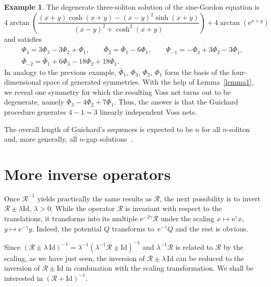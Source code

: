 \documentclass[pdftex]{sigma}
\def\RO{{\mathcal R}}
\numberwithin{equation}{section}
\theoremstyle{definition}
\newtheorem{Example}[Theorem]{Example}
\begin{document}
\begin{Example}
The degenerate three-soliton solution
of the sine-Gordon equation is
\[
4 \arctan\left(\frac{(x + y) \cosh(x + y) - (x - y)^2 \sinh(x + y)}{(x - y)^2 + \cosh^2(x + y)}\right) + 4 \arctan(\mathrm{e}^{x + y})
\]
\cite[equation~(2.13)]{JC-FC-AF-1917} and satisfies
\begin{gather*}
\Phi_4 = 3 \Phi_3 - 3 \Phi_2 + \Phi_1, \qquad
\bar\Phi_2 = \bar\Phi_1 - 6 \Phi_1,
\qquad
\Phi_{-1} = -\Phi_3 + 3 \Phi_2 - 3 \Phi_1, \\
\bar\Phi_{-2} = \bar\Phi_1 + 6 \Phi_3 - 18 \Phi_2 + 18 \Phi_1.
\end{gather*}
In analogy to the previous example, $\bar\Phi_1$, $\Phi_3$, $\Phi_2$, $\Phi_1$
form the basis of
the four-dimensional space of generated symmetries.
With the help of Lemma~\ref{lemma1},
we reveal one symmetry for which the resulting Voss net turns out
to be degenerate, namely $\Phi_3 - 4 \Phi_2 + 7\Phi_1$.
Thus, the answer is that the Guichard procedure generates
$4 - 1 = 3$ linearly independent Voss nets.
\end{Example}

The overall length of Guichard's sequences is expected to be $n$ for all
$n$-soliton and, more generally, all $n$-gap solutions~\cite{Z-T-F-1974}.








\section{More inverse operators}
\label{sect:neg}




Once $\RO^{-1}$ yields practically the same results as $\RO$,
the next possibility is to invert $\RO \pm \lambda \mathrm{Id}$,
$\lambda > 0$.
While the operator $\RO$ is invariant with respect to the translations,
it transforms into its multiple $\mathrm{e}^{-2\gamma} \RO$ under the scaling
$x \mapsto \mathrm{e}^\gamma x$, $y \mapsto \mathrm{e}^{-\gamma} y$.
Indeed, the potential $Q$ transforms to~${\mathrm{e}^{-\gamma} Q}$ and
the rest is obvious.




Since $(\RO \pm \lambda\,\mathrm{Id})^{-1}
 = \lambda^{-1} (\lambda^{-1}\RO \pm \mathrm{Id})^{-1}$ and
$\lambda^{-1}\RO$ is related to $\RO$ by the scaling,
as we have just seen,
the inversion of $\RO \pm \lambda\, \mathrm{Id}$ can be reduced to the inversion
of $\RO \pm \mathrm{Id}$ in combination with the scaling transformation.
We shall be interested in $(\RO + \mathrm{Id})^{-1}$.
\end{document}
